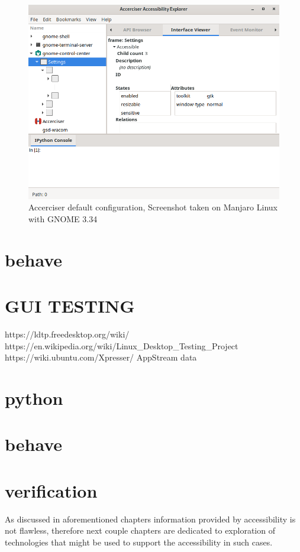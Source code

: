 \begin{figure}[hbt]
	\centering
	\includegraphics[width=1\textwidth]{obrazky-figures/accerciser.png}
	\caption{Accerciser default configuration, Screenshot taken on Manjaro Linux with GNOME 3.34}
	\label{Accerciser}
\end{figure}

\chapter{behave}
\chapter{GUI TESTING}
https://ldtp.freedesktop.org/wiki/
https://en.wikipedia.org/wiki/Linux_Desktop_Testing_Project
https://wiki.ubuntu.com/Xpresser/
AppStream data
\chapter{python}
\chapter{behave}
\chapter{verification}
As discussed in aforementioned chapters information provided by accessibility is not flawless, therefore next couple chapters are dedicated to exploration of technologies that might be used to support the accessibility in such cases.

